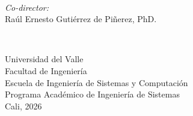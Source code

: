 \documentclass[12pt]{report}
\begin{document}
\begin{titlepage}
\begin{minipage}{0.6\textwidth}
\end{minipage}\\[1cm]

\begin{minipage}{0.6\textwidth}
\begin{center} \large
\emph{Co-director:}\\
Raúl Ernesto Gutiérrez de Piñerez, PhD.
\end{center}

\end{minipage}\\[1cm]

\vfill

\begin{minipage}{0.8\textwidth}
\begin{center} \large
Universidad del Valle\\
Facultad de Ingeniería\\
Escuela de Ingeniería de Sistemas y Computación\\
Programa Académico de Ingeniería de Sistemas\\
Cali, 2026
\end{center}
\end{minipage}\\


\end{titlepage}

\end{document}

